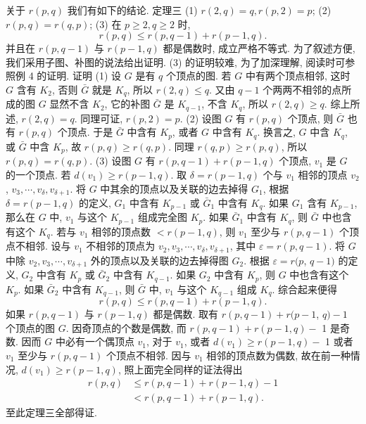 关于 $r(p, q)$ 我们有如下的结论.
定理三 (1) $r(2, q)=q, r(p, 2)=p$;
(2) $r(p, q)=r(q, p)$;
(3) 在 $p \geqslant 2, q \geqslant 2$ 时,
$$
r(p, q) \leqslant r(p, q-1)+r(p-1, q) .
$$
并且在 $r(p, q-1)$ 与 $r(p-1, q)$ 都是偶数时, 成立严格不等式.
为了叙述方便,我们采用子图、补图的说法给出证明.
(3) 的证明较难, 为了加深理解, 阅读时可参照例 4 的证明.
证明 (1) 设 $G$ 是有 $q$ 个顶点的图.
若 $G$ 中有两个顶点相邻, 这时 $G$ 含有 $K_2$, 否则 $\bar{G}$ 就是 $K_q$, 所以 $r(2, q) \leqslant q$. 又由 $q-1$ 个两两不相邻的点所成的图 $G$ 显然不含 $K_2$, 它的补图 $\bar{G}$ 是 $K_{q-1}$, 不含 $K_q$, 所以 $r(2, q) \geqslant q$.
综上所述, $r(2, q)=q$. 同理可证, $r(p, 2)=p$.
(2) 设图 $G$ 有 $r(p, q)$ 个顶点, 则 $\bar{G}$ 也有 $r(p, q)$ 个顶点.
于是 $\bar{G}$ 中含有 $K_p$, 或者 $G$ 中含有 $K_q$. 换言之, $G$ 中含 $K_q$, 或 $\bar{G}$ 中含 $K_p$, 故 $r(p, q) \geqslant r(q, p)$.
同理 $r(q, p) \geqslant r(p, q)$, 所以 $r(p, q)=r(q, p)$.
(3) 设图 $G$ 有 $r(p, q-1)+r(p-1, q)$ 个顶点, $v_1$ 是 $G$ 的一个顶点.
若 $d\left(v_1\right) \geqslant r(p-1, q)$. 取 $\delta=r(p-1, q)$ 个与 $v_1$ 相邻的顶点 $v_2$, $v_3, \cdots, v_\delta, v_{\delta+1}$. 将 $G$ 中其余的顶点以及关联的边去掉得 $G_1$, 根据 $\delta=r(p- 1, q)$ 的定义, $G_1$ 中含有 $K_{p-1}$ 或 $\bar{G}_1$ 中含有 $K_q$. 如果 $G_1$ 含有 $K_{p-1}$, 那么在 $G$ 中, $v_1$ 与这个 $K_{p-1}$ 组成完全图 $K_p$. 如果 $\bar{G}_1$ 中含有 $K_q$, 则 $\bar{G}$ 中也含有这个 $K_q$.
若与 $v_1$ 相邻的顶点数 $<r(p-1, q)$, 则 $v_1$ 至少与 $r(p, q-1)$ 个顶点不相邻.
设与 $v_1$ 不相邻的顶点为 $v_2, v_3, \cdots, v_\delta, v_{\delta+1}$, 其中 $\varepsilon=r(p, q-1)$. 将 $G$ 中除 $v_2, v_3, \cdots, v_{\delta+1}$ 外的顶点以及关联的边去掉得图 $G_2$. 根据 $\varepsilon=r(p$, $q-1)$ 的定义, $G_2$ 中含有 $K_p$ 或 $\bar{G}_2$ 中含有 $K_{q-1}$. 如果 $G_2$ 中含有 $K_p$, 则 $G$ 中也含有这个 $K_p$. 如果 $\bar{G}_2$ 中含有 $K_{q-1}$, 则 $\bar{G}$ 中, $v_1$ 与这个 $K_{q-1}$ 组成 $K_q$.
综合起来便得
$$
r(p, q) \leqslant r(p, q-1)+r(p-1, q) .
$$
如果 $r(p, q-1)$ 与 $r(p-1, q)$ 都是偶数.
取有 $r(p, q-1)+r(p-1$, $q)-1$ 个顶点的图 $G$. 因奇顶点的个数是偶数, 而 $r(p, q-1)+r(p-1, q)-$ 1 是奇数.
因而 $G$ 中必有一个偶顶点 $v_1$, 对于 $v_1$, 或者 $d\left(v_1\right) \geqslant r(p-1, q)-$ 1 或者 $v_1$ 至少与 $r(p, q-1)$ 个顶点不相邻.
因与 $v_1$ 相邻的顶点数为偶数, 故在前一种情况, $d\left(v_1\right) \geqslant r(p-1, q)$, 照上面完全同样的证法得出
$$
\begin{aligned}
r(p, q) & \leqslant r(p, q-1)+r(p-1, q)-1 \\
& <r(p, q-1)+r(p-1, q) .
\end{aligned}
$$
至此定理三全部得证.
